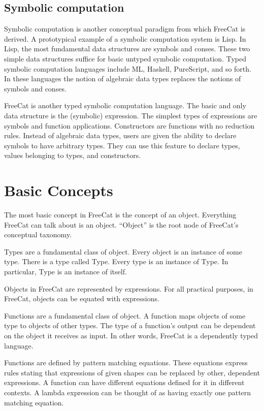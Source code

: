 \documentclass{article}
\begin{document}
\subsection{Symbolic computation}

Symbolic computation is another conceptual paradigm from which FreeCat is derived. A prototypical example of a symbolic computation system is Lisp. In Lisp, the most fundamental data structures are symbols and conses. These two simple data structures suffice for basic untyped symbolic computation. Typed symbolic computation languages include ML, Haskell, PureScript, and so forth. In these languages the notion of algebraic data types replaces the notions of symbols and conses.

FreeCat is another typed symbolic computation language. The basic and only data structure is the (symbolic) expression. The simplest types of expressions are symbols and function applications. Constructors are functions with no reduction rules. Instead of algebraic data types, users are given the ability to declare symbols to have arbitrary types. They can use this feature to declare types, values belonging to types, and constructors.

\section{Basic Concepts}

The most basic concept in FreeCat is the concept of an object. Everything FreeCat can talk about is an object. ``Object'' is the root node of FreeCat's conceptual taxonomy.

Types are a fundamental class of object. Every object is an instance of some type. There is a type called Type. Every type is an instance of Type. In particular, Type is an instance of itself.

Objects in FreeCat are represented by expressions. For all practical purposes, in FreeCat, objects can be equated with expressions.

Functions are a fundamental class of object. A function maps objects of some type to objects of other types. The type of a function's output can be dependent on the object it receives as input. In other words, FreeCat is a dependently typed language.

Functions are defined by pattern matching equations. These equations express rules stating that expressions of given shapes can be replaced by other, dependent expressions. A function can have different equations defined for it in different contexts. A lambda expression can be thought of as having exactly one pattern matching equation.
\end{document}
